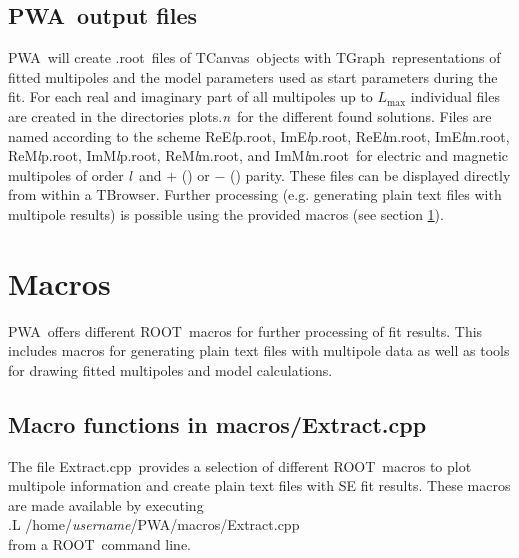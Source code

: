 \documentclass[a4paper,10pt]{article}
\def\PWA{\ttfamily PWA\rmfamily\ }
\def\tt{\ttfamily}
\def\rm{\rmfamily}
\begin{document}
\subsection{\PWA output files}\label{sec_output}

\PWA will create \tt .root\rm\ files of \tt TCanvas\rm\ objects with \tt TGraph\rm\ representations of fitted multipoles
and the model parameters used as start parameters during the fit. For each real and imaginary part of all multipoles up to
$L_\mathrm{max}$ individual files are created in the directories \tt plots.\textit{n}\rm\ for the different found solutions.
Files are named according to the scheme 
\tt ReE\textit{l}p.root\rm, \tt ImE\textit{l}p.root\rm,
\tt ReE\textit{l}m.root\rm, \tt ImE\textit{l}m.root\rm,
\tt ReM\textit{l}p.root\rm, \tt ImM\textit{l}p.root\rm,
\tt ReM\textit{l}m.root\rm, and \tt ImM\textit{l}m.root\rm\
for electric and magnetic multipoles of order \tt\textit{l}\rm\ and $+$ (\tt{p}\rm) or $-$ (\tt{m}\rm) parity.
These files can be displayed directly from within a \tt TBrowser\rm.
Further processing (e.g. generating plain text files with multipole results) is possible using the provided macros (see section
\ref{sec_macros}).

\section{Macros}\label{sec_macros}

\PWA offers different \tt ROOT\rm\ macros for further processing of fit results. This includes macros for generating plain text
files with multipole data as well as tools for drawing fitted multipoles and model calculations.

\subsection{Macro functions in  \tt macros/Extract.cpp\rm}

The file \tt Extract.cpp\rm\ provides a selection of different \tt ROOT\rm\ macros to plot multipole information
and create plain text files with SE fit results. These macros are made available by executing\\
\tt .L /home/\textit{username}/PWA/macros/Extract.cpp\rm\\
from a \tt ROOT\rm\ command line.
\end{document}
